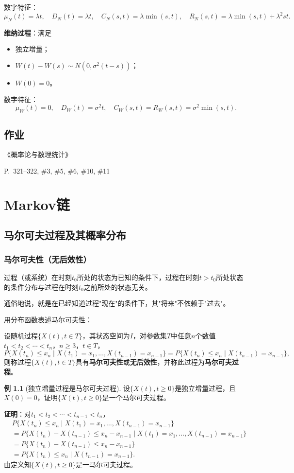 \documentclass[11pt,a4paper]{report}
\theoremstyle{definition}
\newtheorem{example}{例}[chapter]
\begin{document}
数字特征：
\[
\mu_N(t)=\lambda t,\quad D_N(t)=\lambda t,\quad C_N(s,t)=\lambda\min(s,t),\quad R_N(s,t)=\lambda\min(s,t)+\lambda^2st.
\]

\textbf{维纳过程}：满足
\begin{itemize}[leftmargin=2em]
    \item 独立增量；
    \item $W(t)-W(s)\sim N(0,\sigma^2(t-s))$；
    \item $W(0)=0$。
\end{itemize}

数字特征：
\[
\mu_W(t)=0,\quad D_W(t)=\sigma^2t,\quad C_W(s,t)=R_W(s,t)=\sigma^2\min(s,t).
\]

\section*{作业}

《概率论与数理统计》

P.~321--322, \#3, \#5, \#6, \#10, \#11

\newpage
\chapter{Markov链}

\section{马尔可夫过程及其概率分布}

\subsection{马尔可夫性（无后效性）}

过程（或系统）在时刻$t_0$所处的状态为已知的条件下，过程在时刻$t>t_0$所处状态的条件分布与过程在时刻$t_0$之前所处的状态无关。

通俗地说，就是在已经知道过程"现在"的条件下，其"将来"不依赖于"过去"。

用分布函数表述马尔可夫性：

设随机过程$\{X(t),t\in T\}$，其状态空间为$I$，对参数集$T$中任意$n$个数值$t_1<t_2<\cdots<t_n$，$n\geq3$，$t\in T$，
\[
P\{X(t_n)\leq x_n\mid X(t_1)=x_1,\ldots,X(t_{n-1})=x_{n-1}\}=P\{X(t_n)\leq x_n\mid X(t_{n-1})=x_{n-1}\},
\]
则称过程$\{X(t),t\in T\}$具有\textbf{马尔可夫性}或\textbf{无后效性}，并称此过程为\textbf{马尔可夫过程}。

\begin{example}[独立增量过程是马尔可夫过程]
设$\{X(t),t\geq0\}$是独立增量过程，且$X(0)=0$，证明$\{X(t),t\geq0\}$是一个马尔可夫过程。

\textbf{证明}：对$t_1<t_2<\cdots<t_{n-1}<t_n$，
\begin{align*}
&P\{X(t_n)\leq x_n\mid X(t_1)=x_1,\ldots,X(t_{n-1})=x_{n-1}\}\\
&=P\{X(t_n)-X(t_{n-1})\leq x_n-x_{n-1}\mid X(t_1)=x_1,\ldots,X(t_{n-1})=x_{n-1}\}\\
&=P\{X(t_n)-X(t_{n-1})\leq x_n-x_{n-1}\}\\
&=P\{X(t_n)\leq x_n\mid X(t_{n-1})=x_{n-1}\}.
\end{align*}
由定义知$\{X(t),t\geq0\}$是一马尔可夫过程。
\end{example}
\end{document}

